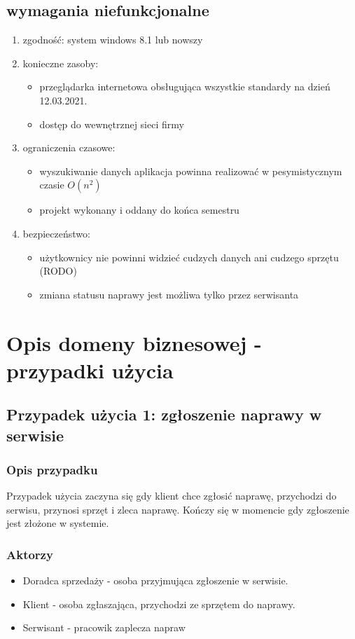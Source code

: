 \documentclass{article}
\begin{document}
\subsection{wymagania niefunkcjonalne}
\begin{enumerate}
    \item zgodność: system windows 8.1 lub nowszy
    \item konieczne zasoby:
    \begin{itemize}
        \item przeglądarka internetowa obsługująca wszystkie standardy na dzień 12.03.2021.
        \item dostęp do wewnętrznej sieci firmy
    \end{itemize}
    \item ograniczenia czasowe:
    \begin{itemize}
        \item wyszukiwanie danych aplikacja powinna realizować w pesymistycznym czasie $O(n^2)$
        \item projekt wykonany i oddany do końca semestru
    \end{itemize}
    \item bezpieczeństwo:
    \begin{itemize}
        \item użytkownicy nie powinni widzieć cudzych danych ani cudzego sprzętu (RODO)
        \item zmiana statusu naprawy jest możliwa tylko przez serwisanta
    \end{itemize}
\end{enumerate}
\section{Opis domeny biznesowej - przypadki użycia}
\subsection{Przypadek użycia 1: zgłoszenie naprawy w serwisie}
\subsubsection{Opis przypadku}
Przypadek użycia zaczyna się gdy klient chce zgłosić naprawę, przychodzi do serwisu, przynosi sprzęt i zleca naprawę. Kończy się w momencie gdy zgłoszenie jest złożone w systemie.
\subsubsection{Aktorzy}
\begin{itemize}
    \item Doradca sprzedaży - osoba przyjmująca zgłoszenie w serwisie.
    \item Klient - osoba zgłaszająca, przychodzi ze sprzętem do naprawy.
    \item Serwisant - pracowik zaplecza napraw
\end{itemize}
\end{document}
